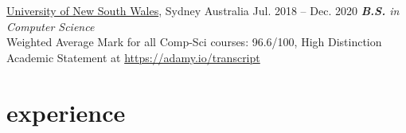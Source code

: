 \documentclass[hidelinks__VERSION__]{adamyi-cv}
\begin{document}
\begin{entrylist}


\entry
{\href{https://unsw.edu.au}{University of New South Wales}, Sydney Australia}
{Jul. 2018 -- Dec. 2020}
{\emph{\textbf{B.S.} in Computer Science}\\
Weighted Average Mark for all Comp-Sci courses: 96.6/100, High Distinction\\
Academic Statement at \href{https://adamy.io/transcript}{https://adamy.io/transcript}
}

\end{entrylist}


\section{experience}
\end{document}

